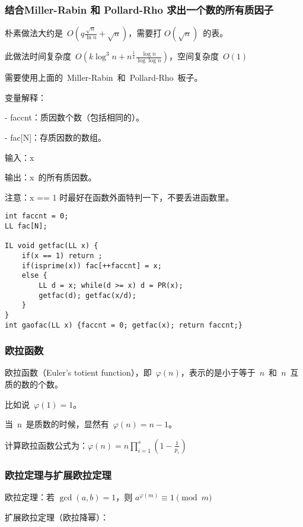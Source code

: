 \documentclass[UTF8]{ctexart}
\begin{document}
\subsubsection{结合Miller-Rabin 和 Pollard-Rho 求出一个数的所有质因子}

朴素做法大约是\ $O(q\frac{\sqrt n}{\ln n} + \sqrt n)$，需要打 $O(\sqrt n)$\ 的表。

此做法时间复杂度\ $O(k\log^3 n + n^\frac{1}{4}\frac{\log n}{\log \log n})$，空间复杂度\ $O(1)$

需要使用上面的\ Miller-Rabin\ 和\ Pollard-Rho\ 板子。

变量解释：

- faccnt：质因数个数（包括相同的）。

- fac[N]：存质因数的数组。

输入：x 

输出：x\ 的所有质因数。

注意：x == 1 时最好在函数外面特判一下，不要丢进函数里。

\begin{framed}
\begin{lstlisting}
int faccnt = 0;
LL fac[N];

IL void getfac(LL x) { 
    if(x == 1) return ;
    if(isprime(x)) fac[++faccnt] = x;
    else {
        LL d = x; while(d >= x) d = PR(x);
        getfac(d); getfac(x/d);
    }
}
int gaofac(LL x) {faccnt = 0; getfac(x); return faccnt;}
\end{lstlisting}
\end{framed}

\subsubsection{欧拉函数}
欧拉函数（Euler's totient function），即\ $\varphi(n)$，表示的是小于等于\ $n$\ 和\ $n$\ 互质的数的个数。

比如说\ $\varphi(1) = 1$。

当\ n\ 是质数的时候，显然有\ $\varphi(n) = n - 1$。

计算欧拉函数公式为：$\varphi(n)=n\prod_{i=1}^s (1 - \frac{1}{p_i})$

\subsubsection{欧拉定理与扩展欧拉定理}

欧拉定理：若 $\gcd (a,b)=1$，则 $a^{\varphi(m)} \equiv 1 \pmod{m} $

扩展欧拉定理（欧拉降幂）：
\end{document}
